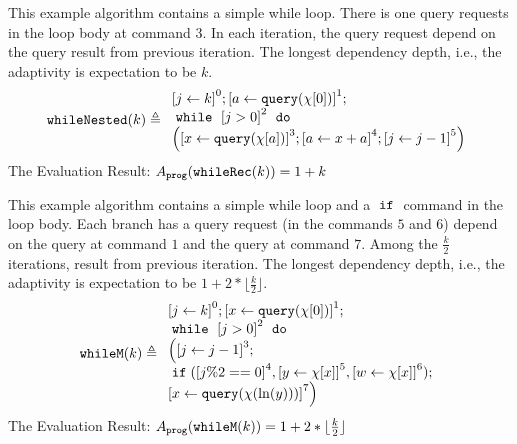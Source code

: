     
\begin{example}
\label{ex:whileNested}
This example algorithm contains a simple while loop.
There is one query requests in the loop body at command $3$.
In each iteration, the query request depend on the query result from previous iteration.
The longest dependency depth, i.e., the adaptivity is expectation to be $k$.
%
\[
%
\kw{whileNested}(k) \triangleq
\begin{array}{l}
    \clabel{ \assign{j}{k} }^{0} ; 
    \clabel{ \assign{a}{\query(\chi[0])} }^{1} ; \\
        \ewhile ~ \clabel{j > 0}^{2} ~ \edo ~ \\
        \Big(
         \clabel{\assign{x}{\query(\chi[a]) }}^{3}  ; 
         \clabel{\assign{a}{x + a}}^{4} ;
        \clabel{\assign{j}{j-1}}^{5}       \Big)
    \end{array}
\]
The Evaluation Result: $ A_{\mathtt{prog}}(\mathtt{whileRec}(k)) = 1 + k$
   \end{example}
            \begin{example}
   \label{ex:whileM}
   This example algorithm contains a simple while loop and a $\;\mathtt{if}\;$ command in the loop body.
Each branch  has a query request (in the commands $5$ and $6$)
depend on the query at command $1$ and the query at command $7$.
Among the $\frac{k}{2}$ iterations,
 result from previous iteration.
The longest dependency depth, i.e., the adaptivity is expectation to be $1 +2 * \lfloor \frac{k}{2} \rfloor$.
            \[
            \kw{whileM}(k) \triangleq 
            \begin{array}{l}
   \clabel{ \assign{j}{k}}^{0} ; 
   \clabel{ \assign{x}{\query(\chi[0])} }^{1} ; \\
\ewhile ~ \clabel{j > 0}^{2} ~ \edo ~ \\
\Big(
 \clabel{\assign{j}{j-1}}^{3} ;\\
 \eif(\clabel{j \% 2 == 0}^{4}, 
 \clabel{\assign{y}{\chi[x]}}^{5}, 
 \clabel{\assign{w}{\chi[x]}}^{6});\\        
 \clabel{\assign{x}{\query(\chi(\ln(y)))} }^{7} \Big)
   \end{array}
            \]
            The Evaluation Result: $ A_{\mathtt{prog}}(\mathtt{whileM}(k)) = 1 +2 * \lfloor \frac{k}{2} \rfloor $
        \end{example}
